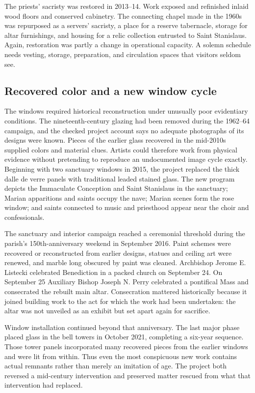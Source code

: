 The priests' sacristy was restored in 2013--14. Work exposed and refinished inlaid wood floors and conserved cabinetry. The connecting chapel made in the 1960s was repurposed as a servers' sacristy, a place for a reserve tabernacle, storage for altar furnishings, and housing for a relic collection entrusted to Saint Stanislaus. Again, restoration was partly a change in operational capacity. A solemn schedule needs vesting, storage, preparation, and circulation spaces that visitors seldom see.

\subsection{Recovered color and a new window cycle}

The windows required historical reconstruction under unusually poor evidentiary conditions. The nineteenth-century glazing had been removed during the 1962--64 campaign, and the checked project account says no adequate photographs of its designs were known. Pieces of the earlier glass recovered in the mid-2010s supplied colors and material clues. Artists could therefore work from physical evidence without pretending to reproduce an undocumented image cycle exactly. Beginning with two sanctuary windows in 2015, the project replaced the thick dalle de verre panels with traditional leaded stained glass. The new program depicts the Immaculate Conception and Saint Stanislaus in the sanctuary; Marian apparitions and saints occupy the nave; Marian scenes form the rose window; and saints connected to music and priesthood appear near the choir and confessionals.

The sanctuary and interior campaign reached a ceremonial threshold during the parish's 150th-anniversary weekend in September 2016. Paint schemes were recovered or reconstructed from earlier designs, statues and ceiling art were renewed, and marble long obscured by paint was cleaned. Archbishop Jerome E. Listecki celebrated Benediction in a packed church on September 24. On September 25 Auxiliary Bishop Joseph N. Perry celebrated a pontifical Mass and consecrated the rebuilt main altar. Consecration mattered historically because it joined building work to the act for which the work had been undertaken: the altar was not unveiled as an exhibit but set apart again for sacrifice.

Window installation continued beyond that anniversary. The last major phase placed glass in the bell towers in October 2021, completing a six-year sequence. Those tower panels incorporated many recovered pieces from the earlier windows and were lit from within. Thus even the most conspicuous new work contains actual remnants rather than merely an imitation of age. The project both reversed a mid-century intervention and preserved matter rescued from what that intervention had replaced.

